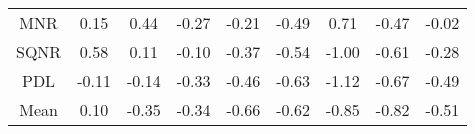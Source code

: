 \documentclass[11pt,a4paper]{report}
\begin{document}
\begin{longtable}{ | c || c | c | c | c | c | c | c || c |}
MNR &  \cellcolor[HTML]{FFFFFF} 0.15 &  \cellcolor[HTML]{F7F7FF} 0.44 &  \cellcolor[HTML]{FFF7F7} -0.27 &  \cellcolor[HTML]{FFF7F7} -0.21 &  \cellcolor[HTML]{FFEFEF} -0.49 &  \cellcolor[HTML]{EFEFFF} 0.71 &  \cellcolor[HTML]{FFF7F7} -0.47 &  \cellcolor[HTML]{FFFFFF} -0.02 \\
SQNR &  \cellcolor[HTML]{EFEFFF} 0.58 &  \cellcolor[HTML]{FFFFFF} 0.11 &  \cellcolor[HTML]{FFFFFF} -0.10 &  \cellcolor[HTML]{FFF7F7} -0.37 &  \cellcolor[HTML]{FFEFEF} -0.54 &  \cellcolor[HTML]{FFE7E7} -1.00 &  \cellcolor[HTML]{FFEFEF} -0.61 &  \cellcolor[HTML]{FFF7F7} -0.28 \\
PDL &  \cellcolor[HTML]{FFFFFF} -0.11 &  \cellcolor[HTML]{FFFFFF} -0.14 &  \cellcolor[HTML]{FFF7F7} -0.33 &  \cellcolor[HTML]{FFF7F7} -0.46 &  \cellcolor[HTML]{FFEFEF} -0.63 &  \cellcolor[HTML]{FFDFDF} -1.12 &  \cellcolor[HTML]{FFEFEF} -0.67 &  \cellcolor[HTML]{FFEFEF} -0.49 \\
\hline
\hline
Mean  &  \cellcolor[HTML]{FFFFFF} 0.10 &  \cellcolor[HTML]{FFF7F7} -0.35 &  \cellcolor[HTML]{FFF7F7} -0.34 &  \cellcolor[HTML]{FFEFEF} -0.66 &  \cellcolor[HTML]{FFEFEF} -0.62 &  \cellcolor[HTML]{FFE7E7} -0.85 &  \cellcolor[HTML]{FFE7E7} -0.82 &  \cellcolor[HTML]{FFEFEF} -0.51 \\
\hline
\end{longtable}
\end{document}
